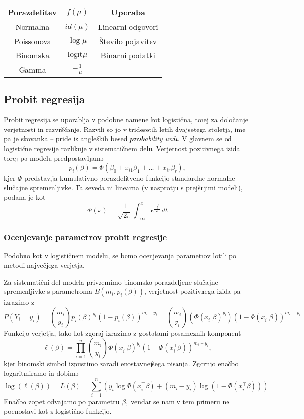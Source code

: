 \documentclass[12pt,a4paper]{amsart}
\theoremstyle{definition} %
\theoremstyle{plain} %
\begin{document}
\begin{center}
    \begin{tabular}{ | c | c | c |}
        \hline
        Porazdelitev & $f(\mu)$ & Uporaba \\
        \hline
        Normalna & $id(\mu)$ &  Linearni odgovori\\
        Poissonova & $\log \mu$ & Število pojavitev \\
        Binomska & $\mathrm{logit}\mu$ & Binarni podatki\\
        Gamma & $-\frac{1}{\mu}$ & \\
        \hline
    \end{tabular}
\end{center}

\subsection{Probit regresija}
Probit regresija se uporablja v podobne namene kot logistična, torej za določanje verjetnosti in razvrščanje. Razvili so jo v tridesetih letih
dvajsetega stoletja, ime pa je skovanka -- pride iz angleških besed \textit{\textbf{prob}ability un\textbf{it}}. V glavnem se od logistične regresije
razlikuje v sistematičnem delu. Verjetnost pozitivnega izida torej po modelu predpostavljamo
\begin{equation}
    p_{i}(\beta) = \Phi (\beta_{0} + x_{i1}\beta_{1} + \ldots + x_{ir}\beta_{r}),
\end{equation}
kjer $\Phi$ predstavlja kumulativno porazdelitveno funkcijo standardne normalne slučajne spremenljivke. Ta seveda ni linearna (v nasprotju s prejšnjimi modeli),
podana je kot 
\[
    \Phi(x) = \frac{1}{\sqrt{2\pi}}\int_{-\infty}^{x}e^{\frac{-t^2}{2}}\,dt
\]

\subsubsection{Ocenjevanje parametrov probit regresije}
Podobno kot v logističnem modelu, se bomo ocenjevanja parametrov lotili po metodi največjega verjetja. 

Za sistematični del modela privzemimo binomsko porazdeljene slučajne spremenljivke s parametroma $B(m_{i},p_{i}(\beta))$,
verjetnost pozitivnega izida pa izrazimo z
\[
    P(Y_{i} = y_{i}) = \binom{m_{i}}{y_{i}}p_{i}(\beta)^{y_{i}}(1 - p_{i}(\beta))^{m_{i} - y_{i}} = \binom{m_{i}}{y_{i}} (\Phi(x_{i}^\top \beta)^{y_{i}})(1 - \Phi(x_{i}^\top \beta))^{m_{i} - y_{i}} 
\]
Funkcijo verjetja, tako kot zgoraj izrazimo z gostotami posameznih komponent
\[
    \ell(\beta) = \prod_{i=1}^{n} \binom{m_{i}}{y_{i}} \Phi(x_{i}^\top\beta)^{y_{i}}(1 - \Phi(x_{i}^\top\beta))^{m_{i} - y_{i}},
\]
kjer binomski simbol izpustimo zaradi enostavnejšega pisanja. Zgornjo enačbo logaritmiramo in dobimo
\begin{equation}
    \log(\ell(\beta)) = L(\beta) = \sum_{i = 1}^{n}\left(y_{i}\log\Phi(x_{i}^\top\beta) + (m_{i} - y_{i})\log(1 - \Phi(x_{i}^\top\beta)) \right)
\end{equation}
Enačbo zopet odvajamo po parametru $\beta,$ vendar se nam v tem primeru ne poenostavi kot z logistično funkcijo.
\end{document}
